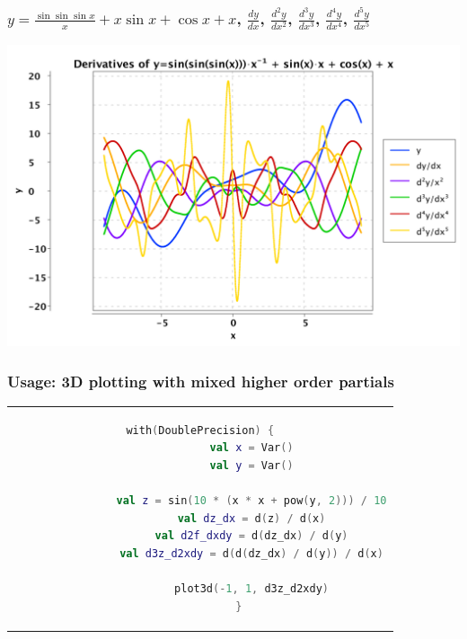 \documentclass{beamer}
\begin{document}
    \begin{frame}
        \frametitle{$y = \frac{\sin{\sin{\sin{x}}}}{x} + x \sin{x} + \cos{x} + x$, $\frac{dy}{dx}$, $\frac{d^{2}y}{dx^2}$, $\frac{d^{3}y}{dx^3}$, $\frac{d^{4}y}{dx^4}$, $\frac{d^{5}y}{dx^5}$}
        \begin{center}
            \includegraphics[scale=0.35]{../figures/plot.png}
        \end{center}
    \end{frame}

    \begin{frame}[fragile]
        \frametitle{Usage: 3D plotting with mixed higher order partials}

        \begin{center}
            \begin{tabular}{c}
        \begin{lstlisting}[language=Kotlin, gobble=12]
            with(DoublePrecision) {
                val x = Var()
                val y = Var()

                val z = sin(10 * (x * x + pow(y, 2))) / 10
                val dz_dx = d(z) / d(x)
                val d2f_dxdy = d(dz_dx) / d(y)
                val d3z_d2xdy = d(d(dz_dx) / d(y)) / d(x)

                plot3d(-1, 1, d3z_d2xdy)
            }
        \end{lstlisting}
            \end{tabular}
        \end{center}
    \end{frame}
\end{document}
